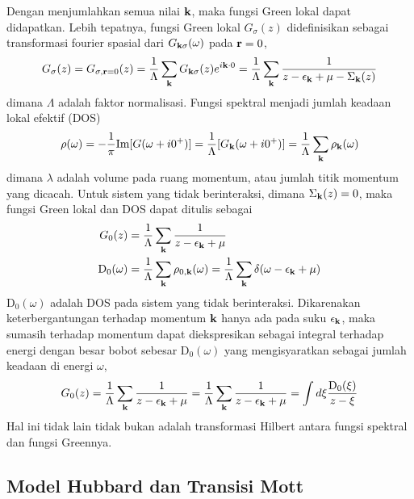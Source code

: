 Dengan menjumlahkan semua nilai $\textbf{k}$, maka fungsi Green lokal dapat didapatkan. Lebih tepatnya, fungsi Green lokal $G_\sigma(z)$ didefinisikan sebagai transformasi fourier spasial dari $G_{\textbf{k}\sigma}(\omega)$ pada $\textbf{r} = 0$,
\begin{align}
G_\sigma(z) = G_{\sigma,\textbf{r} = 0}(z) = \frac{1}{\Lambda} \sum_{\textbf{k}} G_{\textbf{k}\sigma}(z)e^{i\textbf{k}\cdot 0} = \frac{1}{\Lambda}
\sum_{\textbf{k}} \frac{1}{z - \epsilon_{\textbf{k}} + \mu - \Sigma_{\textbf{k}}(z)}
\end{align}
dimana $\Lambda$  adalah faktor normalisasi. Fungsi spektral menjadi jumlah keadaan lokal efektif (DOS)
\begin{align}
\rho(\omega) = -\frac{1}{\pi} \text{Im}[G(\omega + i0^+)] = \frac{1}{\Lambda}[G_{\textbf{k}}(\omega + i0^+)] = \frac{1}{\Lambda}\sum_{\textbf{k}} \rho_{\textbf{k}} (\omega)
\end{align}
dimana $\lambda$ adalah volume pada ruang momentum, atau jumlah titik momentum yang dicacah. Untuk sistem yang tidak berinteraksi, dimana $\Sigma_{\textbf{k}}(z) = 0$, maka fungsi Green lokal dan DOS dapat ditulis sebagai
\begin{align}
G_0(z) &= \frac{1}{\Lambda} \sum_{\textbf{k}} \frac{1}{z - \epsilon_{\textbf{k}} + \mu} \\
\text{D}_0(\omega) &= \frac{1}{\Lambda} \sum_{\textbf{k}} \rho_{0,\textbf{k}}(\omega) = \frac{1}{\Lambda} \sum_{\textbf{k}} \delta(\omega - \epsilon_{\textbf{k}} + \mu )
\end{align}
$\text{D}_0(\omega)$ adalah DOS pada sistem yang tidak berinteraksi. Dikarenakan keterbergantungan terhadap momentum $\textbf{k}$ hanya ada pada suku $\epsilon_{\textbf{k}}$, maka sumasih terhadap momentum dapat diekspresikan sebagai integral terhadap energi dengan besar bobot sebesar $\text{D}_0(\omega)$ yang mengisyaratkan sebagai jumlah keadaan di energi $\omega$,
\begin{align}
G_0(z) = \frac{1}{\Lambda} \sum_{\textbf{k}} \frac{1}{z - \epsilon_{\textbf{k}} + \mu}  = \frac{1}{\Lambda} \sum_{\textbf{k}} \frac{1}{z - \epsilon_{\textbf{k}} + \mu} = \int d\xi \frac{\text{D}_0(\xi)}{z - \xi}
\end{align}
Hal ini tidak lain tidak bukan adalah transformasi Hilbert antara fungsi spektral dan fungsi Greennya.

\subsection{Model Hubbard dan Transisi Mott}

